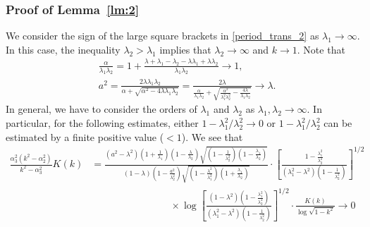 \documentclass[11pt]{amsart}
\numberwithin{equation}{section}
\numberwithin{figure}{section}
\theoremstyle{plain} %
\theoremstyle{definition} %
\begin{document}
\subsubsection{Proof of Lemma~\ref{lm:2}} %

We consider the sign of the large square brackets in \eqref{period_trans_2} as $\lambda_1 \to \infty$. 
In this case, the inequality $\lambda_2>\lambda_1$ implies that $\lambda_2\to \infty$ and $k\to 1$. 
Note that 
\begin{align*}
& \frac{\alpha}{\lambda_1 \lambda_2} = 1+\frac{\lambda+\lambda_1-\lambda_2-\lambda\lambda_1+\lambda\lambda_2}{\lambda_1 \lambda_2} \to 1, \\
& a^2 = \frac{2 \lambda\lambda_1\lambda_2}{\alpha+\sqrt{\alpha^2-4\lambda\lambda_1\lambda_2}} 
= \frac{2 \lambda}{\frac{\alpha}{\lambda_1\lambda_2}+\sqrt{\frac{\alpha^2}{\lambda_1^2\lambda_2^2}-\frac{4\lambda}{\lambda_1\lambda_2}}} 
\to \lambda. 
\end{align*}
In general, we have to consider the orders of $\lambda_1$ and $\lambda_2$ 
as $\lambda_1, \lambda_2\to \infty$. 
In particular, for the following estimates, either $1-\lambda_1^2/\lambda_2^2 \to 0$ or $1-\lambda_1^2/\lambda_2^2$ can be estimated by a finite positive value ($<1$). 
We see that 
\begin{align*}
\frac{\alpha_3^2(k^2-\alpha_2^2)}{k^2-\alpha_3^2} K(k) 
& = \frac{(a^2-\lambda^2)(1+\frac{1}{\lambda_1})(1-\frac{\lambda}{\lambda_2})\sqrt{(1-\frac{1}{\lambda_2^2})(1-\frac{\lambda_1}{\lambda_2})}}{(1-\lambda)(1-\frac{a^2}{\lambda_2^2})\sqrt{(1-\frac{\lambda^2}{\lambda_1^2})(1+\frac{\lambda_1}{\lambda_2})}}\cdot 
\left[\frac{1-\frac{\lambda_1^2}{\lambda_2^2}}{(\lambda_1^2-\lambda^2)(1-\frac{1}{\lambda_2^2})}\right]^{1/2} \\
&\qquad \qquad \qquad \qquad \times \log \left[\frac{(1-\lambda^2)(1-\frac{\lambda_1^2}{\lambda_2^2})}{(\lambda_1^2-\lambda^2)(1-\frac{1}{\lambda_2^2})}\right]^{1/2}\cdot \frac{K(k)}{\log \sqrt{1-k^2}} 
\to 0 
\end{align*}
\end{document}
